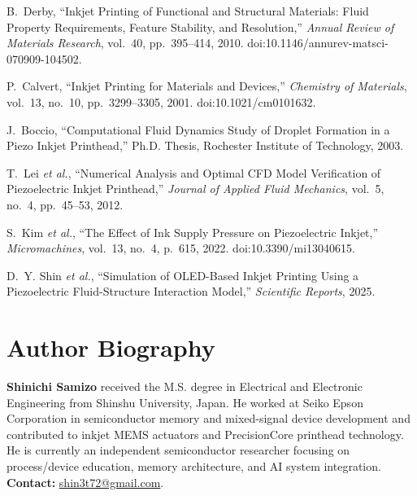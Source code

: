 \documentclass[conference]{IEEEtran}
\begin{document}
\begin{thebibliography}{99}

B.~Derby, ``Inkjet Printing of Functional and Structural Materials: Fluid Property Requirements, Feature Stability, and Resolution,'' \emph{Annual Review of Materials Research}, vol.~40, pp.~395--414, 2010. doi:10.1146/annurev-matsci-070909-104502.

P.~Calvert, ``Inkjet Printing for Materials and Devices,'' \emph{Chemistry of Materials}, vol.~13, no.~10, pp.~3299--3305, 2001. doi:10.1021/cm0101632.

J.~Boccio, ``Computational Fluid Dynamics Study of Droplet Formation in a Piezo Inkjet Printhead,'' Ph.D. Thesis, Rochester Institute of Technology, 2003.

T.~Lei \emph{et al.}, ``Numerical Analysis and Optimal CFD Model Verification of Piezoelectric Inkjet Printhead,'' \emph{Journal of Applied Fluid Mechanics}, vol.~5, no.~4, pp.~45--53, 2012.

S.~Kim \emph{et al.}, ``The Effect of Ink Supply Pressure on Piezoelectric Inkjet,'' \emph{Micromachines}, vol.~13, no.~4, p.~615, 2022. doi:10.3390/mi13040615.

D.~Y. Shin \emph{et al.}, ``Simulation of OLED-Based Inkjet Printing Using a Piezoelectric Fluid-Structure Interaction Model,'' \emph{Scientific Reports}, 2025.

\end{thebibliography}

\section*{Author Biography}
\textbf{Shinichi Samizo} received the M.S. degree in Electrical and Electronic Engineering from Shinshu University, Japan. He worked at Seiko Epson Corporation in semiconductor memory and mixed-signal device development and contributed to inkjet MEMS actuators and PrecisionCore printhead technology. He is currently an independent semiconductor researcher focusing on process/device education, memory architecture, and AI system integration. \textbf{Contact:} \href{mailto:shin3t72@gmail.com}{shin3t72@gmail.com}.
\end{document}
